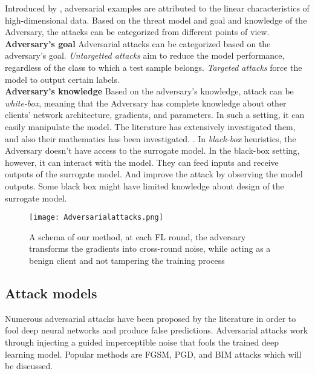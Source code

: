 Introduced by \cite{szegedy2013intriguing}, adversarial examples are attributed to the linear characteristics of high-dimensional data. \cite{goodfellow2014explaining} Based on the threat model and goal and knowledge of the Adversary, the attacks can be categorized from different points of view.
\\\textbf{Adversary's goal} Adversarial attacks can be categorized based on the adversary's goal. \textit{Untargetted attacks} aim to reduce the model performance,  regardless of the class to which a test sample belongs. \textit{Targeted attacks} force the model to output certain labels.
\\\textbf{Adversary's knowledge} Based on the adversary's knowledge, attack can be  \textit{white-box},
meaning that the Adversary has complete knowledge about other clients' network architecture, gradients, and parameters. In such a setting, it can easily manipulate the model. The literature has extensively investigated them, and also their mathematics has been investigated.\cite{tramer2017ensemble} \cite{xu2020adversarial}. In \textit{black-box} heuristics, the Adversary doesn't have access to the surrogate model. In the black-box setting, however, it can interact with the model. They can feed inputs and receive outputs of the surrogate model. And improve the attack by observing the model outputs. Some black box might have limited knowledge about design of the surrogate model.\cite{yue2021black,9000972,cheng2019improving}




\begin{figure}[t!]
 \centering
 \texttt{[image: Adversarialattacks.png]}
 \caption{A schema of our method, at each FL round, the adversary transforms the gradients into cross-round noise, while acting as a benign client and not tampering the training process}
 \label{fig:pgd-atta-comparison}
\end{figure}

\subsection{Attack models}
Numerous adversarial attacks have been proposed by the literature in order to fool deep neural networks and produce false predictions. Adversarial attacks work through injecting a guided imperceptible noise that fools the trained deep learning model. Popular methods are  FGSM, PGD, and BIM attacks which will be discussed.

